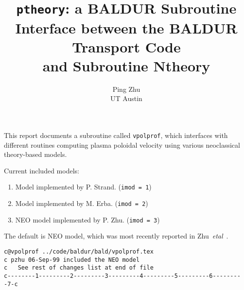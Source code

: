\headheight 0pt \headsep 0pt  \topmargin 0pt  \oddsidemargin 0pt
\textheight 9.0in \textwidth 6.5in

\title{ {\tt ptheory}: a BALDUR Subroutine \\
 Interface between the BALDUR Transport Code \\
 and Subroutine Ntheory}     %
\author{
        Ping Zhu \\ UT Austin}
\maketitle                 %

This report documents a subroutine called {\tt vpolprof}, which 
interfaces with different routines computing plasma poloidal velocity 
using various neoclassical theory-based models.

Current included models:
\begin{enumerate}
\item Model implemented by P. Strand. ({\tt imod = 1})
\item Model implemented by M. Erba. ({\tt imod = 2})
\item NEO model implemented by P. Zhu. ({\tt imod = 3})
\end{enumerate}

The default is NEO model, which was most recently reported in Zhu~{\it etal}~\cite{zhu99}.

\begin{verbatim}
c@vpolprof ../code/baldur/bald/vpolprof.tex
c pzhu 06-Sep-99 included the NEO model
c   See rest of changes list at end of file
c--------1---------2---------3---------4---------5---------6---------7-c
\end{verbatim}

